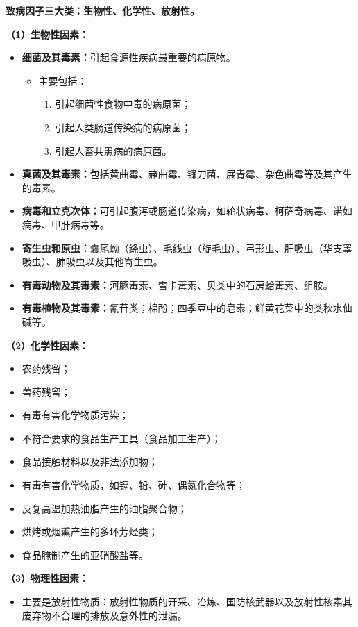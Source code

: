 \begin{keybox}
\textbf{致病因子三大类：生物性、化学性、放射性。}

\textbf{（1）生物性因素：}
\begin{itemize}[leftmargin=*]
    \item \textbf{细菌及其毒素：}引起食源性疾病最重要的病原物。
    \begin{itemize}
        \item 主要包括：
        \begin{enumerate}
            \item 引起细菌性食物中毒的病原菌；
            \item 引起人类肠道传染病的病原菌；
            \item 引起人畜共患病的病原菌。
        \end{enumerate}
    \end{itemize}
    \item \textbf{真菌及其毒素：}包括黄曲霉、赭曲霉、镰刀菌、展青霉、杂色曲霉等及其产生的毒素。
    \item \textbf{病毒和立克次体：}可引起腹泻或肠道传染病，如轮状病毒、柯萨奇病毒、诺如病毒、甲肝病毒等。
    \item \textbf{寄生虫和原虫：}囊尾蚴（绦虫）、毛线虫（旋毛虫）、弓形虫、肝吸虫（华支睾吸虫）、肺吸虫以及其他寄生虫。
    \item \textbf{有毒动物及其毒素：}河豚毒素、雪卡毒素、贝类中的石房蛤毒素、组胺。
    \item \textbf{有毒植物及其毒素：}氰苷类；棉酚；四季豆中的皂素；鲜黄花菜中的类秋水仙碱等。
\end{itemize}

\textbf{（2）化学性因素：}
\begin{itemize}[leftmargin=*]
    \item 农药残留；
    \item 兽药残留；
    \item 有毒有害化学物质污染；
    \item 不符合要求的食品生产工具（食品加工生产）；
    \item 食品接触材料以及非法添加物；
    \item 有毒有害化学物质，如镉、铅、砷、偶氮化合物等；
    \item 反复高温加热油脂产生的油脂聚合物；
    \item 烘烤或烟熏产生的多环芳烃类；
    \item 食品腌制产生的亚硝酸盐等。
\end{itemize}

\textbf{（3）物理性因素：}
\begin{itemize}[leftmargin=*]
    \item 主要是放射性物质：放射性物质的开采、冶炼、国防核武器以及放射性核素其废弃物不合理的排放及意外性的泄漏。
\end{itemize}
\end{keybox}

